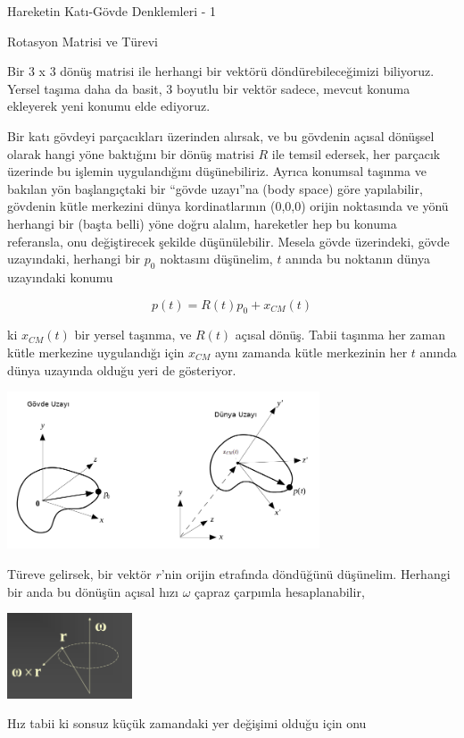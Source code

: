 \documentclass[12pt,fleqn]{article}\usepackage{../../common}
\begin{document}
Hareketin Katı-Gövde Denklemleri - 1

Rotasyon Matrisi ve Türevi

Bir 3 x 3 dönüş matrisi ile herhangi bir vektörü döndürebileceğimizi biliyoruz.
Yersel taşıma daha da basit, 3 boyutlu bir vektör sadece, mevcut konuma
ekleyerek yeni konumu elde ediyoruz.

Bir katı gövdeyi parçacıkları üzerinden alırsak, ve bu gövdenin açısal dönüşsel
olarak hangi yöne baktığını bir dönüş matrisi $R$ ile temsil edersek, her
parçacık üzerinde bu işlemin uygulandığını düşünebiliriz. Ayrıca konumsal
taşınma ve bakılan yön başlangıçtaki bir ``gövde uzayı''na (body space) göre
yapılabilir, gövdenin kütle merkezini dünya kordinatlarının (0,0,0) orijin
noktasında ve yönü herhangi bir (başta belli) yöne doğru alalım, hareketler hep
bu konuma referansla, onu değiştirecek şekilde düşünülebilir.  Mesela gövde
üzerindeki, gövde uzayındaki, herhangi bir $p_0$ noktasını düşünelim, $t$ anında
bu noktanın dünya uzayındaki konumu

$$
p(t) = R(t) p_0 + x_{CM}(t)
$$

ki $x_{CM}(t)$ bir yersel taşınma, ve $R(t)$ açısal dönüş. Tabii taşınma her
zaman kütle merkezine uygulandığı için $x_{CM}$ aynı zamanda kütle merkezinin
her $t$ anında dünya uzayında olduğu yeri de gösteriyor.

\includegraphics[width=25em]{phy_005_basics_04_04.png}

Türeve gelirsek, bir vektör $r$'nin orijin etrafında döndüğünü
düşünelim. Herhangi bir anda bu dönüşün açısal hızı $\omega$ çapraz çarpımla
hesaplanabilir,

\includegraphics[width=10em]{phy_005_basics_04_03.png}

Hız tabii ki sonsuz küçük zamandaki yer değişimi olduğu için onu
\end{document}
